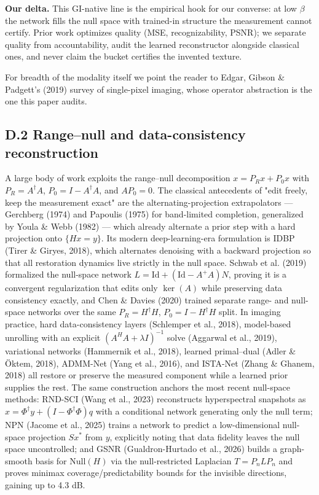 \documentclass[11pt]{article}
\begin{document}
\textbf{Our delta.} This GI-native line is the empirical hook for our converse: at low $\beta$ the network fills the null space with trained-in structure the measurement cannot certify. Prior work optimizes quality (MSE, recognizability, PSNR); we separate quality from accountability, audit the learned reconstructor alongside classical ones, and never claim the bucket certifies the invented texture.

For breadth of the modality itself we point the reader to Edgar, Gibson \& Padgett's (2019) survey of single-pixel imaging, whose operator abstraction is the one this paper audits.

\subsection*{D.2 Range--null and data-consistency reconstruction}

A large body of work exploits the range--null decomposition $x = P_R x + P_0 x$ with $P_R = A^\dagger A$, $P_0 = I - A^\dagger A$, and $A P_0 = 0$. The classical antecedents of "edit freely, keep the measurement exact" are the alternating-projection extrapolators --- Gerchberg (1974) and Papoulis (1975) for band-limited completion, generalized by Youla \& Webb (1982) --- which already alternate a prior step with a hard projection onto $\{Hx = y\}$. Its modern deep-learning-era formulation is IDBP (Tirer \& Giryes, 2018), which alternates denoising with a backward projection so that all restoration dynamics live strictly in the null space. Schwab et al. (2019) formalized the null-space network $L = \mathrm{Id} + (\mathrm{Id} - A^+A)N$, proving it is a convergent regularization that edits only $\ker(A)$ while preserving data consistency exactly, and Chen \& Davies (2020) trained separate range- and null-space networks over the same $P_R = H^\dagger H$, $P_0 = I - H^\dagger H$ split. In imaging practice, hard data-consistency layers (Schlemper et al., 2018), model-based unrolling with an explicit $(A^H A + \lambda I)^{-1}$ solve (Aggarwal et al., 2019), variational networks (Hammernik et al., 2018), learned primal--dual (Adler \& Öktem, 2018), ADMM-Net (Yang et al., 2016), and ISTA-Net (Zhang \& Ghanem, 2018) all restore or preserve the measured component while a learned prior supplies the rest. The same construction anchors the most recent null-space methods: RND-SCI (Wang et al., 2023) reconstructs hyperspectral snapshots as $x = \Phi^\dagger y + (I - \Phi^\dagger \Phi)q$ with a conditional network generating only the null term; NPN (Jacome et al., 2025) trains a network to predict a low-dimensional null-space projection $Sx^*$ from $y$, explicitly noting that data fidelity leaves the null space uncontrolled; and GSNR (Gualdron-Hurtado et al., 2026) builds a graph-smooth basis for $\mathrm{Null}(H)$ via the null-restricted Laplacian $T = P_n L P_n$ and proves minimax coverage/predictability bounds for the invisible directions, gaining up to 4.3 dB.
\end{document}
